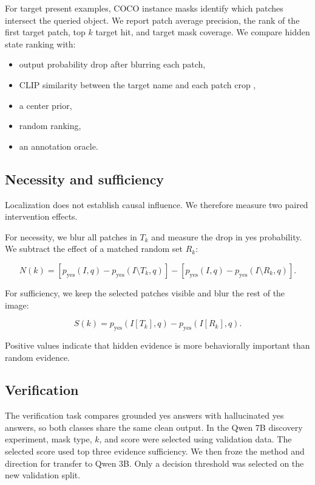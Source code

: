 \documentclass{article}
\begin{document}
For target present examples, COCO instance masks identify which patches intersect the queried object. We report patch average precision, the rank of the first target patch, top $k$ target hit, and target mask coverage. We compare hidden state ranking with:

\begin{itemize}
    \item output probability drop after blurring each patch,
    \item CLIP similarity between the target name and each patch crop \citep{radford2021clip},
    \item a center prior,
    \item random ranking,
    \item an annotation oracle.
\end{itemize}

\subsection{Necessity and sufficiency}

Localization does not establish causal influence. We therefore measure two paired intervention effects.

For necessity, we blur all patches in $T_k$ and measure the drop in yes probability. We subtract the effect of a matched random set $R_k$:

\begin{equation}
N(k)=\left[p_{\mathrm{yes}}(I,q)-p_{\mathrm{yes}}(I\setminus T_k,q)\right]
-\left[p_{\mathrm{yes}}(I,q)-p_{\mathrm{yes}}(I\setminus R_k,q)\right].
\end{equation}

For sufficiency, we keep the selected patches visible and blur the rest of the image:

\begin{equation}
S(k)=p_{\mathrm{yes}}(I[T_k],q)-p_{\mathrm{yes}}(I[R_k],q).
\end{equation}

Positive values indicate that hidden evidence is more behaviorally important than random evidence.

\subsection{Verification}

The verification task compares grounded yes answers with hallucinated yes answers, so both classes share the same clean output. In the Qwen 7B discovery experiment, mask type, $k$, and score were selected using validation data. The selected score used top three evidence sufficiency. We then froze the method and direction for transfer to Qwen 3B. Only a decision threshold was selected on the new validation split.
\end{document}
